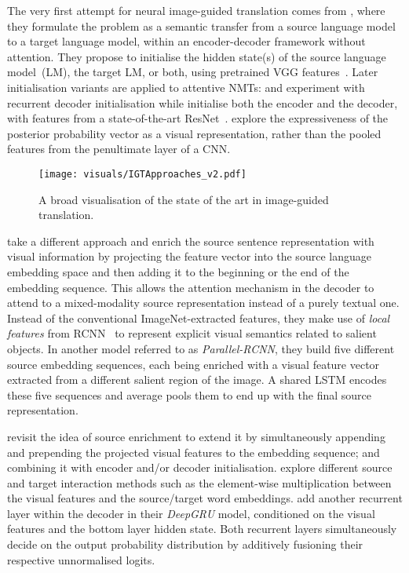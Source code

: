 \documentclass{svjour3}
\begin{document}
The very first attempt for neural image-guided translation comes from \cite{elliott2015multi}, where they formulate the problem as a semantic transfer from a source language model to a target language model, within an encoder-decoder framework without attention. They propose to initialise the hidden state(s) of the source language model~(LM), the target LM, or both, using pretrained VGG features~\citep{simonyan-vgg-2014}. Later initialisation variants are applied to attentive NMTs: \cite{calixto-elliott-frank:2016:WMT} and \cite{libovicky-cuni-2016} experiment with recurrent decoder initialisation while \cite{ma-EtAl:2017:WMT1} initialise both the encoder and the decoder, with features from a state-of-the-art ResNet~\citep{he-resnet-2016}. \cite{madhyastha-wang-specia:2017:WMT} explore the expressiveness of the posterior probability vector as a visual representation, rather than the pooled features from the penultimate layer of a CNN.

\begin{figure}[t]
\centering
\texttt{[image: visuals/IGTApproaches\_v2.pdf]}
\caption{A broad visualisation of the state of the art in image-guided translation.}
\label{fig:ict:approaches}
\end{figure}

\cite{huang-attention-based-2016} take a different approach and enrich the source sentence representation with visual information by projecting the feature vector into the source language embedding space and then adding it to the beginning or the end of the embedding sequence. This allows the attention mechanism in the decoder to attend to a mixed-modality source representation instead of a purely textual one. Instead of the conventional ImageNet-extracted features, they make use of \textit{local features} from RCNN~\citep{girshick-rcnn-2014} to represent explicit visual semantics related to salient objects. In another model referred to as \textit{Parallel-RCNN}, they build five different source embedding sequences, each being enriched with a visual feature vector extracted from a different salient region of the image. A shared LSTM encodes these five sequences and average pools them to end up with the final source representation.

\cite{calixto-incorporating-2017} revisit the idea of source enrichment to extend it by simultaneously appending and prepending the projected visual features to the embedding sequence; and combining it with encoder and/or decoder initialisation. \cite{caglayan-lium-cvc-2017} explore different source and target interaction methods such as the element-wise multiplication between the visual features and the source/target word embeddings. \cite{delbrouck-dupont:2018:WMT} add another recurrent layer within the decoder in their \textit{DeepGRU} model, conditioned on the visual features and the bottom layer hidden state. Both recurrent layers simultaneously decide on the output probability distribution by additively fusioning their respective unnormalised logits.
\end{document}
